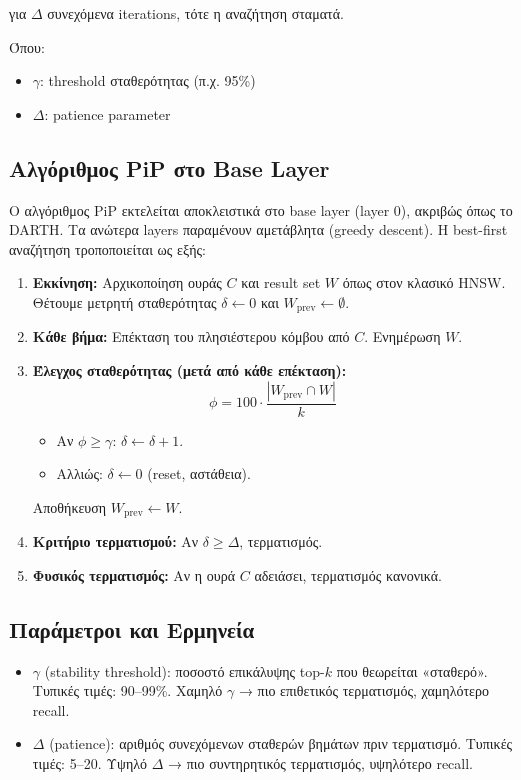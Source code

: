 \documentclass[12pt,a4paper]{article}
\begin{document}
για $\Delta$ συνεχόμενα iterations, τότε η αναζήτηση σταματά.

Όπου:
\begin{itemize}
    \item $\gamma$: threshold σταθερότητας (π.χ. 95\%)
    \item $\Delta$: patience parameter
\end{itemize}

\subsection{Αλγόριθμος PiP στο Base Layer}

Ο αλγόριθμος PiP εκτελείται αποκλειστικά στο base layer (layer 0), ακριβώς όπως το DARTH. Τα ανώτερα layers παραμένουν αμετάβλητα (greedy descent). Η best-first αναζήτηση τροποποιείται ως εξής:

\begin{enumerate}
  \item \textbf{Εκκίνηση:} Αρχικοποίηση ουράς $C$ και result set $W$ όπως στον κλασικό HNSW. Θέτουμε μετρητή σταθερότητας $\delta \leftarrow 0$ και $W_{\text{prev}} \leftarrow \emptyset$.
  \item \textbf{Κάθε βήμα:} Επέκταση του πλησιέστερου κόμβου από $C$. Ενημέρωση $W$.
  \item \textbf{Έλεγχος σταθερότητας (μετά από κάθε επέκταση):}
    \[
    \phi = 100 \cdot \frac{|W_{\text{prev}} \cap W|}{k}
    \]
    \begin{itemize}
      \item Αν $\phi \ge \gamma$: $\delta \leftarrow \delta + 1$.
      \item Αλλιώς: $\delta \leftarrow 0$ (reset, αστάθεια).
    \end{itemize}
    Αποθήκευση $W_{\text{prev}} \leftarrow W$.
  \item \textbf{Κριτήριο τερματισμού:} Αν $\delta \ge \Delta$, τερματισμός.
  \item \textbf{Φυσικός τερματισμός:} Αν η ουρά $C$ αδειάσει, τερματισμός κανονικά.
\end{enumerate}

\subsection{Παράμετροι και Ερμηνεία}
\begin{itemize}
  \item $\gamma$ (stability threshold): ποσοστό επικάλυψης top-$k$ που θεωρείται «σταθερό». Τυπικές τιμές: 90--99\%. Χαμηλό $\gamma$ → πιο επιθετικός τερματισμός, χαμηλότερο recall.
  \item $\Delta$ (patience): αριθμός συνεχόμενων σταθερών βημάτων πριν τερματισμό. Τυπικές τιμές: 5--20. Υψηλό $\Delta$ → πιο συντηρητικός τερματισμός, υψηλότερο recall.
\end{itemize}
\end{document}
